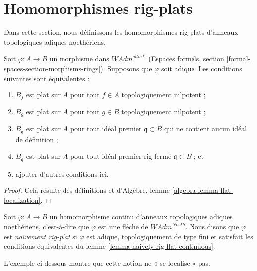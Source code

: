 \section{Homomorphismes rig-plats}
\label{section-rig-flat-homomorphisms}

\noindent
Dans cette section, nous définissons les homomorphismes rig-plats
d'anneaux topologiques adiques noethériens.

\begin{lemma}
\label{lemma-naively-rig-flat-continuous}
Soit $\varphi : A \to B$ un morphisme dans $\textit{WAdm}^{adic*}$
(Espaces formels, section \ref{formal-spaces-section-morphisms-rings}).
Supposons que $\varphi$ soit adique. Les conditions suivantes sont équivalentes :
\begin{enumerate}
\item $B_f$ est plat sur $A$ pour tout
$f \in A$ topologiquement nilpotent ;
\item $B_g$ est plat sur $A$ pour tout
$g \in B$ topologiquement nilpotent ;
\item $B_\mathfrak q$ est plat sur $A$
pour tout idéal premier $\mathfrak q \subset B$ qui ne contient
aucun idéal de définition ;
\item $B_\mathfrak q$ est plat sur $A$ pour tout idéal premier
rig-fermé $\mathfrak q \subset B$ ; et
\item ajouter d'autres conditions ici.
\end{enumerate}
\end{lemma}

\begin{proof}
Cela résulte des définitions et d'Algèbre,
lemme \ref{algebra-lemma-flat-localization}.
\end{proof}

\begin{definition}
\label{definition-naively-rig-flat}
Soit $\varphi : A \to B$ un homomorphisme continu d'anneaux
topologiques adiques noethériens, c'est-à-dire que $\varphi$
est une flèche de $\textit{WAdm}^{Noeth}$. Nous disons que $\varphi$ est
{\it naïvement rig-plat} si $\varphi$ est adique, topologiquement
de type fini et satisfait les conditions équivalentes du
lemme \ref{lemma-naively-rig-flat-continuous}.
\end{definition}

\noindent
L'exemple ci-dessous montre que cette notion ne « se localise » pas.

